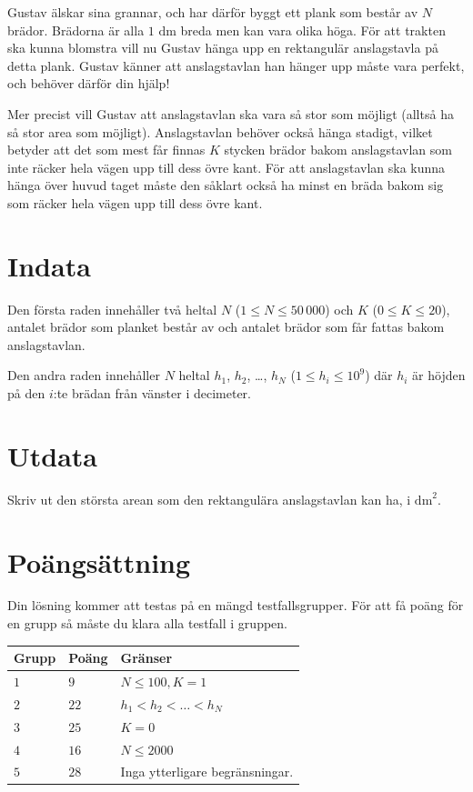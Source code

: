 Gustav älskar sina grannar, och har därför byggt ett plank som består av $N$ brädor. Brädorna är alla $1 \text{ dm}$ breda men kan vara olika höga. 
För att trakten ska kunna blomstra vill nu Gustav hänga upp en rektangulär anslagstavla på detta plank.
Gustav känner att anslagstavlan han hänger upp måste vara perfekt, och behöver därför din hjälp!

Mer precist vill Gustav att anslagstavlan ska vara så stor som möjligt (alltså ha så stor area som möjligt).
Anslagstavlan behöver också hänga stadigt, vilket betyder att det som mest får finnas $K$ stycken brädor bakom anslagstavlan som inte räcker hela vägen upp till dess övre kant.
För att anslagstavlan ska kunna hänga över huvud taget måste den såklart också ha minst en bräda bakom sig som räcker hela vägen upp till dess övre kant.

\section*{Indata}
Den första raden innehåller två heltal $N$ ($1 \le N \le 50\,000$) och $K$ ($0 \le K \le 20$), antalet brädor som planket består av och antalet brädor som får fattas bakom anslagstavlan.

Den andra raden innehåller $N$ heltal $h_{1}$, $h_{2}$, \dots, $h_{N}$ ($1 \le h_{i} \le 10^{9}$) där $h_i$ är höjden på den $i$:te brädan från vänster i decimeter.

\section*{Utdata}
Skriv ut den största arean som den rektangulära anslagstavlan kan ha, i $\text{dm}^{2}$.

\section*{Poängsättning}
Din lösning kommer att testas på en mängd testfallsgrupper.
För att få poäng för en grupp så måste du klara alla testfall i gruppen.

\noindent
\begin{tabular}{| l | l | l |}
  \hline
  \textbf{Grupp} & \textbf{Poäng} & \textbf{Gränser} \\ \hline
  $1$    & $9$       &  $N \le 100, K = 1$\\ \hline 
  $2$    & $22$       &  $h_{1} < h_{2} < \ldots < h_{N}$ \\ \hline
  $3$    & $25$        &  $K = 0$ \\ \hline
  $4$    & $16$        &  $N \le 2000 $ \\ \hline
  $5$    & $28$       &  Inga ytterligare begränsningar. \\ \hline
\end{tabular}


